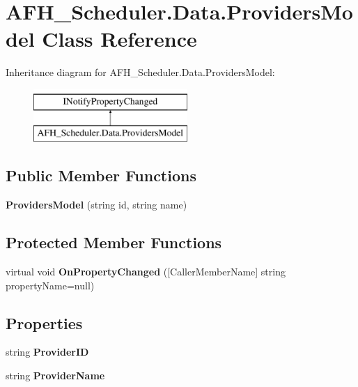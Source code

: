 \section{A\+F\+H\+\_\+\+Scheduler.\+Data.\+Providers\+Model Class Reference}
\label{class_a_f_h___scheduler_1_1_data_1_1_providers_model}
Inheritance diagram for A\+F\+H\+\_\+\+Scheduler.\+Data.\+Providers\+Model\+:\begin{figure}[H]
\begin{center}
\leavevmode
\includegraphics[height=2.000000cm]{class_a_f_h___scheduler_1_1_data_1_1_providers_model}
\end{center}
\end{figure}
\subsection*{Public Member Functions}
\begin{DoxyCompactItemize}
\item 
\mbox{\label{class_a_f_h___scheduler_1_1_data_1_1_providers_model_a9e2747425093e1dfa48018b7b1249418}} 
{\bfseries Providers\+Model} (string id, string name)
\end{DoxyCompactItemize}
\subsection*{Protected Member Functions}
\begin{DoxyCompactItemize}
\item 
\mbox{\label{class_a_f_h___scheduler_1_1_data_1_1_providers_model_a331acdf792e0ede8469bb257ab1618f8}} 
virtual void {\bfseries On\+Property\+Changed} ([Caller\+Member\+Name] string property\+Name=null)
\end{DoxyCompactItemize}
\subsection*{Properties}
\begin{DoxyCompactItemize}
\item 
\mbox{\label{class_a_f_h___scheduler_1_1_data_1_1_providers_model_afd2398f440236e1af0f56a36dd3f57b2}} 
string {\bfseries Provider\+ID}\hspace{0.3cm}{\ttfamily  [get, set]}
\item 
\mbox{\label{class_a_f_h___scheduler_1_1_data_1_1_providers_model_a000c8598c1a6acbe47218cf90df74cbc}} 
string {\bfseries Provider\+Name}\hspace{0.3cm}{\ttfamily  [get, set]}
\end{DoxyCompactItemize}
